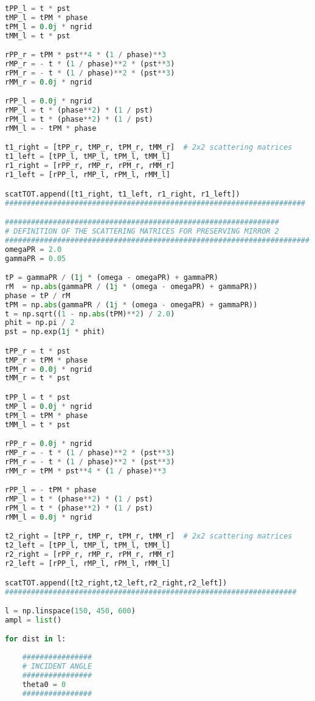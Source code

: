 \documentclass[aps,prl,10pt,onecolumn,superscriptaddress]{revtex4-2}
\begin{document}
\begin{lstlisting}[language=Python, caption=Script for Figure \ref{LCPlcp}]
tPP_l = t * pst 
tMP_l = tPM * phase 
tPM_l = 0.0j * ngrid
tMM_l = t * pst 

rPP_r = tPM * pst**4 * (1 / phase)**3 
rMP_r = - t * (1 / phase)**2 * (pst**3) 
rPM_r = - t * (1 / phase)**2 * (pst**3) 
rMM_r = 0.0j * ngrid

rPP_l = 0.0j * ngrid
rMP_l = t * (phase**2) * (1 / pst)
rPM_l = t * (phase**2) * (1 / pst)
rMM_l = - tPM * phase

t1_right = [tPP_r, tMP_r, tPM_r, tMM_r]  # 2x2 scattering matrices
t1_left = [tPP_l, tMP_l, tPM_l, tMM_l]
r1_right = [rPP_r, rMP_r, rPM_r, rMM_r]
r1_left = [rPP_l, rMP_l, rPM_l, rMM_l]

scatTOT.append([t1_right, t1_left, r1_right, r1_left])
#####################################################################

###############################################################
# DEFINITION OF THE SCATTERING MATRICES FOR PRESERVING MIRROR 2
######################################################################
omegaPR = 2.0
gammaPR = 0.05

tP = gammaPR / (1j * (omega - omegaPR) + gammaPR)
rM  = np.abs(gammaPR / (1j * (omega - omegaPR) + gammaPR))
phase = tP / rM
tPM = np.abs(gammaPR / (1j * (omega - omegaPR) + gammaPR))
t = np.sqrt((1 - np.abs(tPM)**2) / 2.0)
phit = np.pi / 2
pst = np.exp(1j * phit)

tPP_r = t * pst
tMP_r = tPM * phase
tPM_r = 0.0j * ngrid
tMM_r = t * pst

tPP_l = t * pst
tMP_l = 0.0j * ngrid
tPM_l = tPM * phase
tMM_l = t * pst

rPP_r = 0.0j * ngrid
rMP_r = - t * (1 / phase)**2 * (pst**3) 
rPM_r = - t * (1 / phase)**2 * (pst**3) 
rMM_r = tPM * pst**4 * (1 / phase)**3

rPP_l = - tPM * phase
rMP_l = t * (phase**2) * (1 / pst)
rPM_l = t * (phase**2) * (1 / pst)
rMM_l = 0.0j * ngrid

t2_right = [tPP_r, tMP_r, tPM_r, tMM_r]  # 2x2 scattering matrices
t2_left = [tPP_l, tMP_l, tPM_l, tMM_l]
r2_right = [rPP_r, rMP_r, rPM_r, rMM_r]
r2_left = [rPP_l, rMP_l, rPM_l, rMM_l]

scatTOT.append([t2_right,t2_left,r2_right,r2_left])
###################################################################

l = np.linspace(150, 450, 600)
ampl = list()

for dist in l:
    
    ################
    # INCIDENT ANGLE
    ################
    theta0 = 0
    ################


\end{lstlisting}
\end{document}
